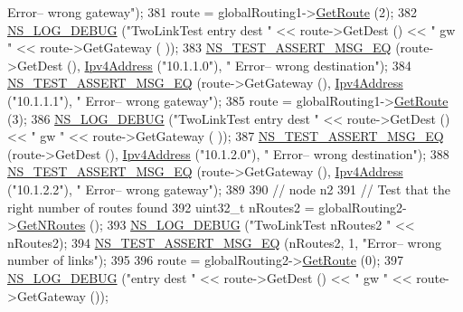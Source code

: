 \begin{DoxyCode}
{      Error-- wrong gateway"});
381   route = globalRouting1->\hyperlink{classns3_1_1Ipv4GlobalRouting_accd518b9888908dbea189c1d1c73dcf1}{GetRoute} (2);
382   \hyperlink{group__logging_ga413f1886406d49f59a6a0a89b77b4d0a}{NS\_LOG\_DEBUG} (\textcolor{stringliteral}{"TwoLinkTest entry dest "} << route->GetDest () << \textcolor{stringliteral}{" gw "} << route->GetGateway (
      ));
383   \hyperlink{group__testing_ga2a9d78cffb3db8e867c35fff0b698cf5}{NS\_TEST\_ASSERT\_MSG\_EQ} (route->GetDest (), \hyperlink{classns3_1_1Ipv4Address}{Ipv4Address} (\textcolor{stringliteral}{"10.1.1.0"}), \textcolor{stringliteral}{"
      Error-- wrong destination"});
384   \hyperlink{group__testing_ga2a9d78cffb3db8e867c35fff0b698cf5}{NS\_TEST\_ASSERT\_MSG\_EQ} (route->GetGateway (), \hyperlink{classns3_1_1Ipv4Address}{Ipv4Address} (\textcolor{stringliteral}{"10.1.1.1"}), \textcolor{stringliteral}{"
      Error-- wrong gateway"});
385   route = globalRouting1->\hyperlink{classns3_1_1Ipv4GlobalRouting_accd518b9888908dbea189c1d1c73dcf1}{GetRoute} (3);
386   \hyperlink{group__logging_ga413f1886406d49f59a6a0a89b77b4d0a}{NS\_LOG\_DEBUG} (\textcolor{stringliteral}{"TwoLinkTest entry dest "} << route->GetDest () << \textcolor{stringliteral}{" gw "} << route->GetGateway (
      ));
387   \hyperlink{group__testing_ga2a9d78cffb3db8e867c35fff0b698cf5}{NS\_TEST\_ASSERT\_MSG\_EQ} (route->GetDest (), \hyperlink{classns3_1_1Ipv4Address}{Ipv4Address} (\textcolor{stringliteral}{"10.1.2.0"}), \textcolor{stringliteral}{"
      Error-- wrong destination"});
388   \hyperlink{group__testing_ga2a9d78cffb3db8e867c35fff0b698cf5}{NS\_TEST\_ASSERT\_MSG\_EQ} (route->GetGateway (), \hyperlink{classns3_1_1Ipv4Address}{Ipv4Address} (\textcolor{stringliteral}{"10.1.2.2"}), \textcolor{stringliteral}{"
      Error-- wrong gateway"});
389 
390   \textcolor{comment}{// node n2}
391   \textcolor{comment}{// Test that the right number of routes found}
392   uint32\_t nRoutes2 = globalRouting2->\hyperlink{classns3_1_1Ipv4GlobalRouting_abb9d2b3642272b9bd2697a5699922fa7}{GetNRoutes} ();
393   \hyperlink{group__logging_ga413f1886406d49f59a6a0a89b77b4d0a}{NS\_LOG\_DEBUG} (\textcolor{stringliteral}{"TwoLinkTest nRoutes2 "} << nRoutes2);
394   \hyperlink{group__testing_ga2a9d78cffb3db8e867c35fff0b698cf5}{NS\_TEST\_ASSERT\_MSG\_EQ} (nRoutes2, 1, \textcolor{stringliteral}{"Error-- wrong number of links"});
395 
396   route = globalRouting2->\hyperlink{classns3_1_1Ipv4GlobalRouting_accd518b9888908dbea189c1d1c73dcf1}{GetRoute} (0);
397   \hyperlink{group__logging_ga413f1886406d49f59a6a0a89b77b4d0a}{NS\_LOG\_DEBUG} (\textcolor{stringliteral}{"entry dest "} << route->GetDest () << \textcolor{stringliteral}{" gw "} << route->GetGateway ());

\end{DoxyCode}
